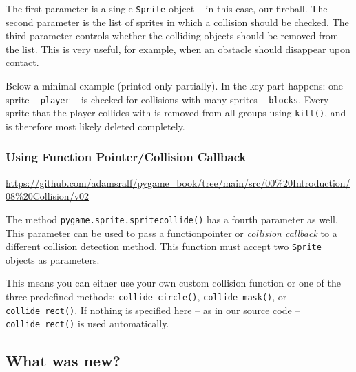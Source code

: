 The first parameter is a single \texttt{Sprite} object -- in this case, our fireball. The second parameter is the list of sprites in which a collision should be checked. The third parameter controls whether the colliding objects should be removed from the list. This is very useful, for example, when an obstacle should disappear upon contact.

Below a minimal example (printed only partially). In  the key part happens: one sprite -- \texttt{player} -- is checked for collisions with many sprites -- \texttt{blocks}. Every sprite that the player collides with is removed from all groups using \texttt{kill()}, and is therefore most likely deleted completely.



\subsubsection{Using Function Pointer/Collision Callback}
\begin{diskbox}
	\url{https://github.com/adamsralf/pygame_book/tree/main/src/00%20Introduction/08%20Collision/v02}
\end{diskbox}

The method \texttt{pygame.sprite.spritecollide()} has a fourth parameter as well. This parameter can be used to pass a \gls{functionpointer} or \emph{collision callback} to a different collision detection method. This function must accept two \texttt{Sprite} objects as parameters.  

This means you can either use your own custom collision function or one of the three predefined methods: \texttt{collide\_circle()}, \texttt{collide\_mask()}, or \texttt{collide\_rect()}. If nothing is specified here -- as in our source code -- \texttt{collide\_rect()} is used automatically.



\newpage
\subsection{What was new?}

